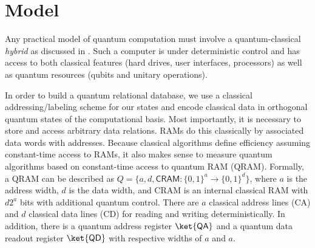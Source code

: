 \documentclass{toc}
\theoremstyle{plain}
\theoremstyle{definition}
\begin{document}
{\section{Model}
\label{sec:model}

Any practical model of quantum computation
must involve a quantum-classical \textit{hybrid} as
discussed in \cite{oemer00}. Such a
computer is under deterministic control and has access to both classical
features (hard drives, user interfaces, processors)
as well as quantum resources (qubits and
unitary operations).


In order to build a quantum relational database, we use a
classical addressing/labeling scheme for our states and
encode classical data in orthogonal quantum states of the
computational basis.
Most importantly, it is necessary to
store and access arbitrary data relations. RAMs do this classically by
associated data words with addresses.
%
Because classical algorithms define efficiency assuming constant-time
access to RAMs, it also makes sense to measure quantum algorithms based
on constant-time access to quantum RAM (QRAM).
Formally, a QRAM can be described as
$Q=\{a,d,\textsf{CRAM}:\{0,1\}^a\rightarrow\{0,1\}^d\}$,
where  $a$ is the address width,
$d$ is the data width, and \textsf{CRAM} is an internal classical
RAM with $d2^a$ bits with additional quantum control.
There are $a$ classical address lines
(\textsf{CA}) and $d$ classical data lines (\textsf{CD})
for reading and writing deterministically.
In addition, there is a quantum address register $\ket{\textsf{QA}}$
and a quantum data readout register $\ket{\textsf{QD}}$ with respective
widths of $a$ and $a$.

}
\end{document}
